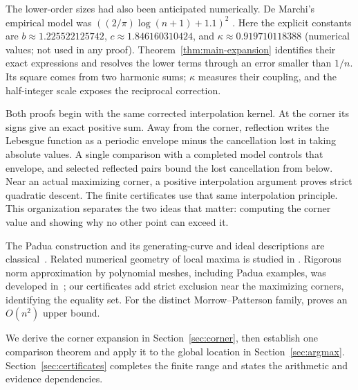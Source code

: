 The lower-order sizes had also been anticipated numerically. De Marchi's
empirical model was $((2/\pi)\log(n+1)+1.1)^2$
\cite[Section~1.1, pp.~3--5]{DeMarchi2005NearOptimal}.
Here the explicit constants are
$b\approx1.225522125742$, $c\approx1.846160310424$, and
$\kappa\approx0.919710118388$ (numerical values; not used in any proof). Theorem~\ref{thm:main-expansion}
identifies their exact expressions and resolves the lower terms through
an error smaller than $1/n$. Its square
comes from two harmonic sums; $\kappa$ measures their coupling, and the
half-integer scale exposes the reciprocal correction.

Both proofs begin with the same corrected interpolation kernel. At the
corner its signs give an exact positive sum. Away from the corner, reflection
writes the Lebesgue function as a periodic envelope minus the cancellation
lost in taking absolute values. A single comparison with a completed model
controls that envelope, and selected reflected pairs bound the lost
cancellation from below. Near an
actual maximizing corner, a positive interpolation argument proves strict
quadratic descent. The finite certificates use that same interpolation
principle. This organization separates the two ideas that matter: computing
the corner value and showing why no other point can exceed it.

The Padua construction and its generating-curve and ideal descriptions
are classical~\cite{BosCaliariDeMarchiVianelloXu2006,BosDeMarchiVianelloXu2007}.
Related numerical geometry of local maxima is studied in
\cite{BialasCiezDeMarchiSuder2026}. Rigorous norm approximation by polynomial
meshes, including Padua examples, was developed in~\cite{Mesh2024}; our
certificates add strict exclusion near the maximizing corners, identifying
the equality set.
For the distinct Morrow--Patterson family,
\cite{MorrowPatterson2026} proves an $O(n^2)$ upper bound.

We derive the corner expansion in Section~\ref{sec:corner}, then establish
one comparison theorem and apply it to the global location in
Section~\ref{sec:argmax}. Section~\ref{sec:certificates} completes the finite
range and states the arithmetic and evidence dependencies.
